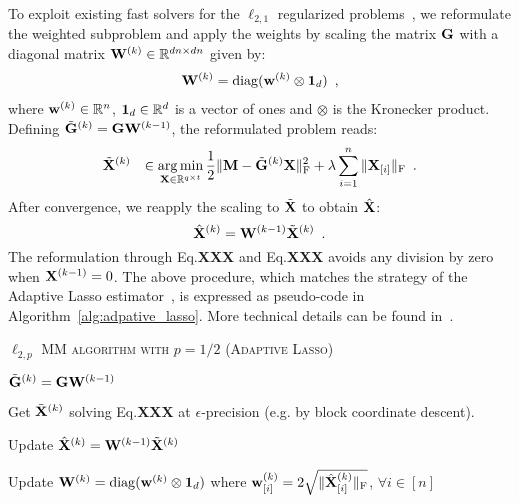 To exploit existing fast solvers for the $\ell_{2,1}$ regularized problems~\cite{strohmeier-etal:16,Ndiaye_Fercoq_Gramfort_Salmon15}, we reformulate the weighted subproblem and apply the weights by scaling the matrix $\mathbf{G}$ with a diagonal matrix $\mathbf{W}^{(k)} \in \mathbb{R}^{dn \times dn}$ given by:
\begin{eqnarray} \label{eq:weights}
\mathbf{W}^{(k)} = \mathrm{diag}(\mathbf{w}^{(k)} \otimes \mathbf{1}_{d}) \enspace ,
\end{eqnarray}
where $\mathbf{w}^{(k)} \in \mathbb{R}^{n}$, $\mathbf{1}_{d}\in\mathbb{R}^d$ is a vector of ones and $\otimes$ is the Kronecker product.
Defining $\tilde{\mathbf{G}}^{(k)}=\mathbf{G} \mathbf{W}^{(k-1)}$, the reformulated problem reads:
\begin{eqnarray}\label{eq:lasso_new_gram}
\tilde{\mathbf{X}}^{(k)} &
 & \in \mathop{\mathrm{arg}\,\mathrm{min}}_{\mathbf{X}\in\mathbb{R}^{q \times t}} \frac{1}{2}\|{\mathbf{M} - \tilde{\mathbf{G}}^{(k)} \mathbf{X}}\|_{\rm F}^2  + \lambda \sum_{i=1}^n \|{\mathbf{X}_{[i]}}\|_{\rm F} \enspace .
\end{eqnarray}
After convergence, we reapply the scaling to $\tilde{\mathbf{X}}$ to obtain $\hat{\mathbf{X}}$:
\begin{equation}
    \label{eq:MM_weights}
    \hat{\mathbf{X}}^{(k)} = \mathbf{W}^{(k-1)} \tilde{\mathbf{X}}^{(k)} \enspace .
\end{equation}
The reformulation through Eq.\textbf{XXX} %
 and Eq.\textbf{XXX} %
 avoids any division by zero when $\mathbf{X}^{(k-1)}=0$. The above procedure, which matches the strategy of the Adaptive Lasso estimator~\cite{Zou06}, is expressed as pseudo-code in Algorithm~\ref{alg:adpative_lasso}. More technical details can be found in~\cite[Algorithm 3]{strohmeier-etal:16}.


{\fontsize{4}{4}\selectfont
\begin{algorithm}[t]
\caption{\textsc{$\ell_{2,p}$ MM algorithm with $p=1/2$ (Adaptive Lasso)}}
    {
		$\tilde{\mathbf{G}}^{(k)} = \mathbf{G} \mathbf{W}^{(k-1)}$

		Get $\tilde{\mathbf{X}}^{(k)}$ solving Eq.\textbf{XXX} at $\epsilon$-precision (e.g. by block coordinate descent).  %

		Update $\hat{\mathbf{X}}^{(k)} = \mathbf{W}^{(k-1)} \tilde{\mathbf{X}}^{(k)}$

	    Update $\mathbf{W}^{(k)}=\mathrm{diag}(\mathbf{w}^{(k)} \otimes \mathbf{1}_{d})$ where $\mathbf{w}^{(k)}_{[i]} = 2 \sqrt{\|{\hat{\mathbf{X}}^{(k)}_{[i]}}\|_{\rm F}}$,  $\forall i\in [n]$


     }
\end{algorithm}
}

